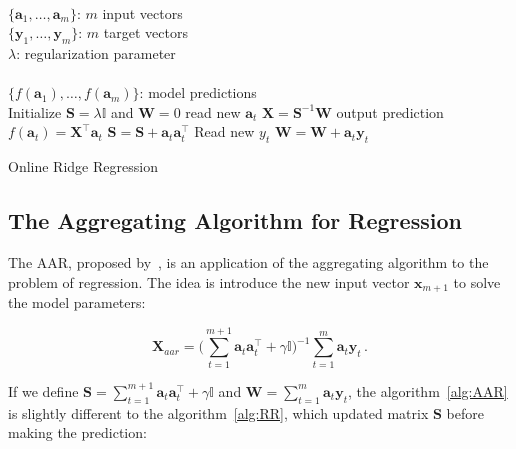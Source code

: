 \begin{algorithm}[H]
\begin{algorithmic}[1]
\REQUIRE $\,$ \\
$\{\mathbf{a}_1,\dots,\mathbf{a}_{m} \}$: $m$ input vectors \\
$\{\mathbf{y}_1,\dots,\mathbf{y}_{m} \}$: $m$ target vectors \\
$\lambda$: regularization parameter \\
\ENSURE  $\,$ \\
$\{f(\mathbf{a}_1),\dots,f(\mathbf{a}_{m}) \}$: model predictions \\
\STATE Initialize $\mathbf{S}=\lambda \mathbb{I}$
and $\mathbf{W}=0$
	\STATE read new $\mathbf{a}_t$
	\STATE $\mathbf{X}=\mathbf{S}^{-1}\mathbf{W}$
	\STATE output prediction $f(\mathbf{a}_t) = \mathbf{X}^\top \mathbf{a}_t$
   	\STATE $\mathbf{S} = \mathbf{S} + \mathbf{a}_t \mathbf{a}_t^\top$
   	\STATE Read new $y_t$
    	\STATE $\mathbf{W} = \mathbf{W} + \mathbf{a}_t \mathbf{y}_t$
\ENDFOR
\end{algorithmic}
\caption{Online Ridge Regression}
\label{alg:RR}
\end{algorithm}



\subsection{The Aggregating Algorithm for Regression}

The AAR, proposed by~\cite{vovk2001}, is an application of the aggregating
algorithm to the problem of regression. The idea is introduce the new input
vector $\mathbf{x}_{m+1}$ to solve the model parameters: 

\begin{equation}
\label{eq:AARexpand}
\mathbf{X}_{aar} = \displaystyle \big (\sum_{t=1}^{m+1}
\mathbf{a}_t \mathbf{a}_t  ^\intercal + \gamma \mathbb{I}\big )^{-1}
\sum_{t=1}^m \mathbf{a}_t \mathbf{y}_t \, .
\end{equation}

If we define $\displaystyle\mathbf{S}= \sum_{t=1}^{m+1} \mathbf{a}_t
\mathbf{a}_t  ^\intercal + \gamma \mathbb{I} $ and $\mathbf{W}=
\displaystyle\sum_{t=1}^m \mathbf{a}_t \mathbf{y}_t$, the
algorithm~\ref{alg:AAR} is slightly different to the algorithm~\ref{alg:RR}, 
which updated matrix $\mathbf{S}$ before making the prediction:

